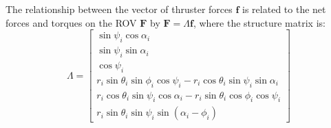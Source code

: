 \documentclass{roguedoc}
\renewcommand{\vec}[1]{\mathbf{#1}}
\begin{document}
The relationship between the vector of thruster forces $\vec{f}$ is related to the net forces and torques on the ROV $\vec{F}$ by $\vec{F} = \Lambda\vec{f}$, where the structure matrix is:
\begin{equation}
  \Lambda =
    \begin{bmatrix}
      \sin\psi_i\cos\alpha_i \\
      \sin\psi_i\sin\alpha_i \\
      \cos\psi_i \\
      r_i\sin\theta_i\sin\phi_i\cos\psi_i - r_i\cos\theta_i\sin\psi_i\sin\alpha_i \\
      r_i\cos\theta_i\sin\psi_i\cos\alpha_i - r_i\sin\theta_i\cos\phi_i\cos\psi_i \\
      r_i\sin\theta_i\sin\psi_i\sin(\alpha_i-\phi_i)
    \end{bmatrix}
\end{equation}
\end{document}
